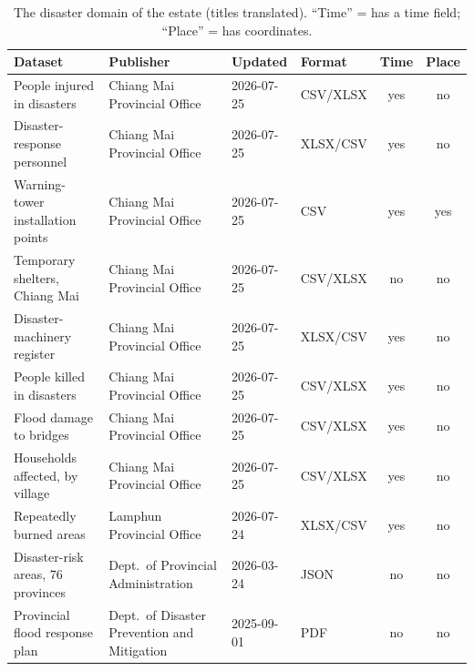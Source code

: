 \documentclass[10pt,twocolumn,a4paper]{article}
\begin{document}
\begin{table}[!t]
\centering\small
\caption{The disaster domain of the estate (titles translated). ``Time'' = has a time field; ``Place'' = has coordinates.}\label{tab:disaster}
\begin{tabularx}{\textwidth}{@{}lXllcc@{}}
\toprule
\textbf{Dataset} & \textbf{Publisher} & \textbf{Updated} & \textbf{Format} & \textbf{Time} & \textbf{Place}\\\midrule
People injured in disasters & Chiang Mai Provincial Office & 2026-07-25 & CSV/XLSX & yes & no\\
Disaster-response personnel & Chiang Mai Provincial Office & 2026-07-25 & XLSX/CSV & yes & no\\
Warning-tower installation points & Chiang Mai Provincial Office & 2026-07-25 & CSV & yes & yes\\
Temporary shelters, Chiang Mai & Chiang Mai Provincial Office & 2026-07-25 & CSV/XLSX & no & no\\
Disaster-machinery register & Chiang Mai Provincial Office & 2026-07-25 & XLSX/CSV & yes & no\\
People killed in disasters & Chiang Mai Provincial Office & 2026-07-25 & CSV/XLSX & yes & no\\
Flood damage to bridges & Chiang Mai Provincial Office & 2026-07-25 & CSV/XLSX & yes & no\\
Households affected, by village & Chiang Mai Provincial Office & 2026-07-25 & CSV/XLSX & yes & no\\
Repeatedly burned areas & Lamphun Provincial Office & 2026-07-24 & XLSX/CSV & yes & no\\
Disaster-risk areas, 76 provinces & Dept.\ of Provincial Administration & 2026-03-24 & JSON & no & no\\
Provincial flood response plan & Dept.\ of Disaster Prevention and Mitigation & 2025-09-01 & PDF & no & no\\\bottomrule
\end{tabularx}
\end{table}
\end{document}
